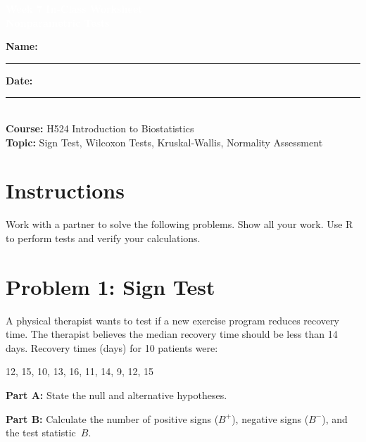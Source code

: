 \documentclass[11pt]{article}
\title{}
\author{}
\date{}
\begin{document}
\begin{tcolorbox}[colback=osaorange,colframe=black,boxrule=2pt,arc=0pt,left=6pt,right=6pt,top=10pt,bottom=10pt]
\centering
\textcolor{white}{\textbf{\Large Week 7 In-Class Worksheet}}\\
\textcolor{white}{\textbf{\large Nonparametric Tests}}
\end{tcolorbox}

\vspace{8pt}

\noindent\textbf{Name:} \rule{8cm}{0.4pt} \hfill \textbf{Date:} \rule{4cm}{0.4pt}\\[0.5ex]
\textbf{Course:} H524 Introduction to Biostatistics\\
\textbf{Topic:} Sign Test, Wilcoxon Tests, Kruskal-Wallis, Normality Assessment

\vspace{8pt}

\section*{Instructions}
Work with a partner to solve the following problems. Show all your work. Use R to perform tests and verify your calculations.

\vspace{12pt}

\section{Problem 1: Sign Test}

A physical therapist wants to test if a new exercise program reduces recovery time. The therapist believes the median recovery time should be less than 14 days. Recovery times (days) for 10 patients were:

\begin{center}
12, 15, 10, 13, 16, 11, 14, 9, 12, 15
\end{center}

\vspace{6pt}

\textbf{Part A:} State the null and alternative hypotheses.

\vspace{2.5cm}

\textbf{Part B:} Calculate the number of positive signs ($B^+$), negative signs ($B^-$), and the test statistic~$B$.

\vspace{3cm}
\end{document}
